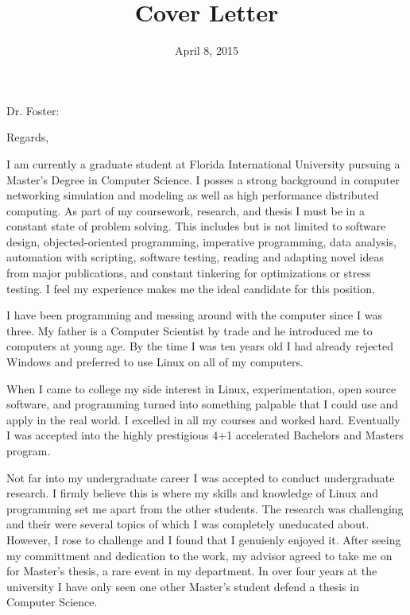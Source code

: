 \documentclass[11pt,a4paper,sans]{moderncv}        %
\title{Cover Letter}                               %
\begin{document}
\date{April 8, 2015}
\opening{Dr. Foster:}
\closing{Regards,}
\makelettertitle

I am currently a graduate student at Florida International University pursuing a Master's
Degree in Computer Science. I posses a strong background in computer networking simulation and
modeling as well as high performance distributed computing. As part of my coursework, research,
and thesis I must be in a constant state of problem solving. This includes but is not limited
to software design, objected-oriented programming, imperative programming, data analysis, automation with
scripting, software testing, reading and adapting novel ideas from major publications, and
constant tinkering for optimizations or stress testing. I feel my
experience makes me the ideal candidate for this position.

I have been programming and messing around with the computer since I was three. My father is a
Computer Scientist by trade and he introduced me to computers at young age. By the time I was
ten years old I had already rejected Windows and preferred to use Linux on all of my
computers.

When I came to college my side interest in Linux, experimentation, open source software, and programming
turned into something palpable that I could use and apply in the real world. I excelled in all
my courses and worked hard. Eventually I was accepted into the highly prestigious 4+1 accelerated
Bachelors and Masters program. 

Not far into my undergraduate career I was accepted to conduct undergraduate research. I firmly believe 
this is where my skills and knowledge of Linux and programming set me apart from the other
students. The research was challenging and their were several topics of which I was completely
uneducated about. However, I rose to challenge and I found that I genuienly enjoyed it. After seeing 
my committment and dedication to the work, my advisor agreed to take me on for Master's thesis, 
a rare event in my department. In over four years at the university I have only seen one other 
Master's student defend a thesis in Computer Science.
\end{document}
